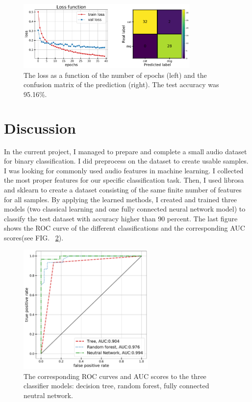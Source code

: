 \documentclass[12pt a4paper]{article}
\numberwithin{equation}{section}
\begin{document}
\begin{figure}[H]
\centering
\includegraphics[width=0.8\textwidth]{fig/conf2.pdf}
\caption{The loss as a function of the number of epochs (left) and the confusion matrix of the prediction (right). The test accuracy was 95.16\%.}
\label{fig9}
\end{figure}

\section{Discussion}

In the current project, I managed to prepare and complete a small audio dataset for binary classification. I did preprocess on the dataset to create usable samples. I was looking for commonly used audio features in machine learning. I collected the most proper features for our specific classification task. Then, I used librosa and sklearn to create a dataset consisting of the same finite number of features for all samples.  By applying the learned methods, I created and trained three models (two classical learning and one fully connected neural network model) to classify the test dataset with accuracy higher than 90 percent. The last figure shows the ROC curve of the different classifications and the corresponding AUC scores(see FIG. ~\ref{fig10}).

\begin{figure}[H]
\centering
\includegraphics[width=0.6\textwidth]{fig/ROC.pdf}
\caption{The corresponding ROC curves and AUC scores to the three classifier models: decision tree, random forest, fully connected neutral network.}
\label{fig10}
\end{figure}
\end{document}
